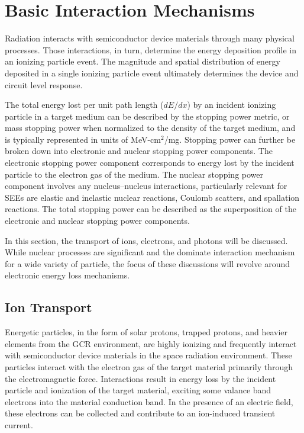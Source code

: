 \section{Basic Interaction Mechanisms} %
\label{sec:basic_interaction_mechanisms}
Radiation interacts with semiconductor device materials through many physical processes.
Those interactions, in turn, determine the energy deposition profile in an ionizing particle event.
The magnitude and spatial distribution of energy deposited in a single ionizing particle event ultimately determines the device and circuit level response.

The total energy lost per unit path length ($dE/dx$) by an incident ionizing particle in a target medium can be described by the stopping power metric, or mass stopping power when normalized to the density of the target medium, and is typically represented in units of MeV-cm$^2$/mg.
Stopping power can further be broken down into electronic and nuclear stopping power components.
The electronic stopping power component corresponds to energy lost by the incident particle to the electron gas of the medium.
The nuclear stopping power component involves any nucleus--nucleus interactions, particularly relevant for SEEs are elastic and inelastic nuclear reactions, Coulomb scatters, and spallation reactions.
The total stopping power can be described as the superposition of the electronic and nuclear stopping power components.

In this section, the transport of ions, electrons, and photons will be discussed.
While nuclear processes are significant and the dominate interaction mechanism for a wide variety of particle, the focus of these discussions will revolve around electronic energy loss mechanisms.

\subsection{Ion Transport} %
\label{sub:ion_transport}
Energetic particles, in the form of solar protons, trapped protons, and heavier elements from the GCR environment, are highly ionizing and frequently interact with semiconductor device materials in the space radiation environment.
These particles interact with the electron gas of the target material primarily through the electromagnetic force.
Interactions result in energy loss by the incident particle and ionization of the target material, exciting some valance band electrons into the material conduction band.
In the presence of an electric field, these electrons can be collected and contribute to an ion-induced transient current.

